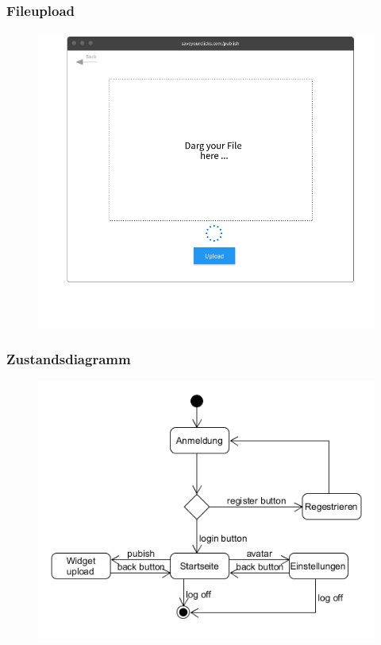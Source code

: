 		\subsubsection{Fileupload}
			\begin{figure}[H]
				\includegraphics[scale=0.5]{images/p4}
			\end{figure}
		
		\subsubsection{Zustandsdiagramm}
			\begin{figure}[H]
				\includegraphics[scale=0.8]{images/zustand}
			\end{figure}
	
